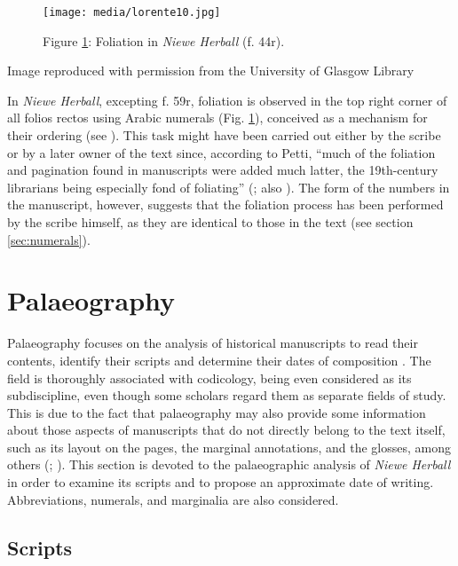 \documentclass{article}
\begin{document}
 \begin{figure}[H]
    \centering
    \texttt{[image: media/lorente10.jpg]}
    \caption{Figure \ref{fig:lorente10}: Foliation in \emph{Niewe Herball} (f. 44r).}
    \label{fig:lorente10}
\end{figure}


 Image reproduced with permission from the University of Glasgow Library 


 
In \emph{Niewe Herball}, excepting f. 59r, foliation is observed in the
top right corner of all folios rectos using Arabic
numerals (Fig. \ref{fig:lorente10}), conceived as a mechanism for their ordering (see
\cite[286]{romero-barranco_early_2017}). This task might have been carried out either by the
scribe or by a later owner of the text since, according to Petti, ``much
of the foliation and pagination found in manuscripts were added much
latter, the 19th-century librarians being especially fond of foliating''
(\cite[38]{petti_english_1977}; also \cite{denholm-young_handwriting_1954}). The form of the numbers in the
manuscript, however, suggests that the foliation process has been performed
by the scribe himself, as they are identical to those in the text (see
section \ref{sec:numerals}).


\section{Palaeography}

Palaeography focuses on the analysis of historical manuscripts to read their
contents, identify their scripts and determine their dates of
composition \citep[140]{mathisen_palaeography_2008}. The field is thoroughly associated
with codicology, being even considered as its subdiscipline, even though some scholars regard them as separate fields of study. This is due
to the fact that palaeography may also provide some information about
those aspects of manuscripts that do not directly belong to the text
itself, such as its layout on the pages, the marginal annotations, and
the glosses, among others (\cite[93]{gruijs_codicology_1972}; \cite[9--10]{derolez_palaeography_2003}). This
section is devoted to the palaeographic analysis of \emph{Niewe
Herball} in order to examine its scripts and to propose an approximate
date of writing. Abbreviations, numerals, and marginalia are also
considered.

\subsection{Scripts}
\end{document}
